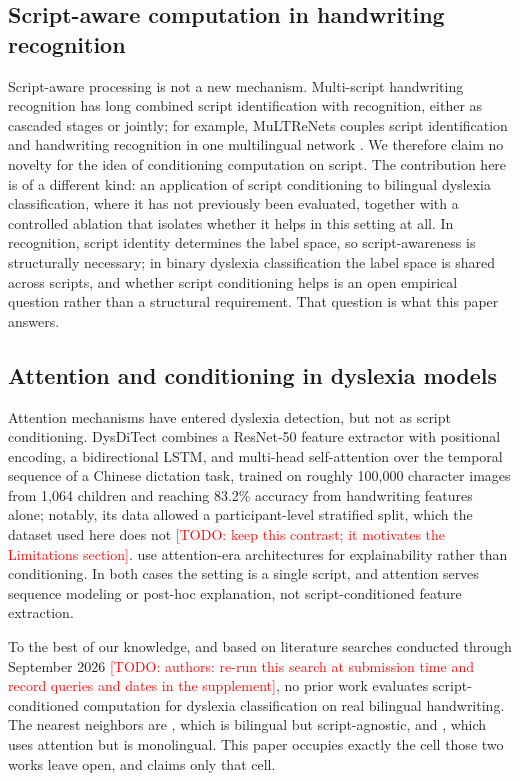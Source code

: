 \documentclass[11pt,a4paper]{article}
\newcommand{\todonote}[1]{\textcolor{red}{[TODO: #1]}}
\begin{document}
\subsection{Script-aware computation in handwriting recognition}

Script-aware processing is not a new mechanism. Multi-script
handwriting recognition has long combined script identification with
recognition, either as cascaded stages or jointly; for example,
MuLTReNets couples script identification and handwriting recognition
in one multilingual network \citep{multrenets2020}. We therefore
claim no novelty for the idea of conditioning computation on script.
The contribution here is of a different kind: an application of
script conditioning to bilingual dyslexia classification, where it
has not previously been evaluated, together with a controlled
ablation that isolates whether it helps in this setting at all. In
recognition, script identity determines the label space, so
script-awareness is structurally necessary; in binary dyslexia
classification the label space is shared across scripts, and whether
script conditioning helps is an open empirical question rather than a
structural requirement. That question is what this paper answers.

\subsection{Attention and conditioning in dyslexia models}

Attention mechanisms have entered dyslexia detection, but not as
script conditioning. DysDiTect \citep{liu2024dysditect} combines a
ResNet-50 feature extractor with positional encoding, a
bidirectional LSTM, and multi-head self-attention over the temporal
sequence of a Chinese dictation task, trained on roughly 100{,}000
character images from 1{,}064 children and reaching 83.2\% accuracy
from handwriting features alone; notably, its data allowed a
participant-level stratified split, which the dataset used here does
not \todonote{keep this contrast; it motivates the Limitations
section}. \citet{robaa2024} use attention-era architectures for
explainability rather than conditioning. In both cases the setting is
a single script, and attention serves sequence modeling or
post-hoc explanation, not script-conditioned feature extraction.

To the best of our knowledge, and based on literature searches
conducted through September 2026 \todonote{authors: re-run this
search at submission time and record queries and dates in the
supplement}, no prior work evaluates script-conditioned computation
for dyslexia classification on real bilingual handwriting. The
nearest neighbors are \citet{kashif2026}, which is bilingual but
script-agnostic, and \citet{liu2024dysditect}, which uses attention
but is monolingual. This paper occupies exactly the cell those two
works leave open, and claims only that cell.
\end{document}
